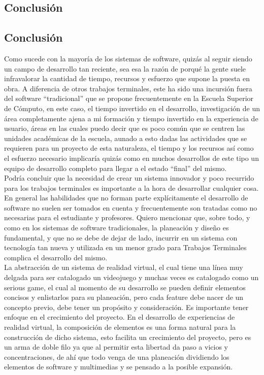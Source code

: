 \begin{center}
\chapter{Conclusión}
\end{center}
\newpage

\section{Conclusión}
Como sucede con la mayoría de los sistemas de software, quizás al seguir siendo un campo de desarrollo tan reciente, sea esa la razón de porqué la gente suele infravalorar la cantidad de tiempo, recursos y esfuerzo que supone la puesta en obra. A diferencia de otros trabajos terminales, este ha sido una incursión fuera del software “tradicional” que se propone frecuentemente en la Escuela Superior de Cómputo, en este caso, el tiempo invertido en el desarrollo, investigación de un área completamente ajena a mi formación y tiempo invertido en la experiencia de usuario, áreas en las cuales puedo decir que es poco común que se centren las unidades académicas de la escuela, aunado a esto dadas las actividades que se requieren para un proyecto de esta naturaleza, el tiempo y los recursos así como el esfuerzo necesario implicaría quizás como en muchos desarrollos de este tipo un equipo de desarrollo completo para llegar a el estado “final” del mismo.\\
 
Podría concluir que la necesidad de crear un sistema innovador y poco recurrido para los trabajos terminales es importante a la hora de desarrollar cualquier cosa.\\

En general las habilidades que no forman parte explícitamente el desarrollo de software no suelen ser tomados en cuenta y frecuentemente son tratadas como no necesarias para el estudiante y profesores. Quiero mencionar que, sobre todo, y como en los sistemas de software tradicionales, la planeación y diseño es fundamental, y que no se debe de dejar de lado, incurrir en un sistema con tecnología tan nueva y utilizada en un menor grado para Trabajos Terminales complica el desarrollo del mismo.\\

La abstracción de un sistema de realidad virtual, el cual tiene una línea muy delgada para ser catalogado un videojuego y muchas veces es catalogado como un serious game, el cual al momento de su desarrollo se pueden definir elementos concisos y enlistarlos para su planeación, pero cada feature debe nacer de un concepto previo, debe tener un propósito y consideración. Es importante tener enfoque en el crecimiento del proyecto. En el desarrollo de experiencias de realidad virtual, la composición de elementos es una forma natural para la construcción de dicho sistema, esto facilita un crecimiento del proyecto, pero es un arma de doble filo ya que al permitir esta libertad da paso a vicios y concentraciones, de ahí que todo venga de una planeación dividiendo los elementos de software y multimedias y se pensado a la posible expansión.\\


